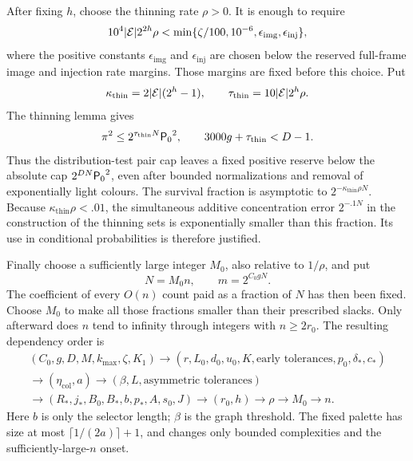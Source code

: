 After fixing \(h\), choose the thinning rate \(\rho>0\).
It is enough to require
\begin{equation}\label{eq:ledger-thinning-rate}
 10^4|\mathcal E|2^{2h}\rho
   <\min\{\zeta/100,10^{-6},\epsilon_{\mathrm{img}},
                  \epsilon_{\mathrm{inj}}\},
\end{equation}
where the positive constants \(\epsilon_{\mathrm{img}}\) and
\(\epsilon_{\mathrm{inj}}\) are chosen below the reserved
full-frame image and injection rate margins.  Those margins
are fixed before this choice.  Put
\[
 \kappa_{\mathrm{thin}}=2|\mathcal E|(2^h-1),\qquad
 \tau_{\mathrm{thin}}=10|\mathcal E|2^h\rho.
\]
The thinning lemma gives
\begin{equation}\label{eq:ledger-thinned-density}
 \pi^2\le2^{\tau_{\mathrm{thin}}N}{\mathsf P_0}^2,
 \qquad 3000g+\tau_{\mathrm{thin}}<D-1.
\end{equation}
Thus the distribution-test pair cap leaves a fixed positive
reserve below the absolute cap \(2^{DN}{\mathsf P_0}^2\), even after
bounded normalizations and removal of exponentially light colours.
The survival fraction is asymptotic to
\(2^{-\kappa_{\mathrm{thin}}\rho N}\).
Because \(\kappa_{\mathrm{thin}}\rho<.01\), the simultaneous
additive concentration error \(2^{-.1N}\) in the construction
of the thinning sets is exponentially smaller than this fraction.
Its use in conditional probabilities is therefore justified.

Finally choose a sufficiently large integer \(M_0\), also relative
to \(1/\rho\), and put
\begin{equation}
                  N=M_0n,\qquad m=2^{C_0gN}.
 \label{eq:ledger-final-dimensions}
\end{equation}
The coefficient of every \(O(n)\) count paid as a fraction of \(N\)
has then been fixed. Choose \(M_0\) to make all those fractions
smaller than their prescribed slacks. Only afterward does \(n\)
tend to infinity through integers with \(n\ge2r_0\).
The resulting dependency order is
\[
 \begin{gathered}
 (C_0,g,D,M,k_{\max},\zeta,K_1)
 \longrightarrow
 (r,L_0,d_0,u_0,K,\text{early tolerances},p_0,\delta_*,c_*)\\
 \longrightarrow(\eta_{\mathrm{col}},a)
 \longrightarrow(\beta,L,\text{asymmetric tolerances})\\
 \longrightarrow(R_*,j_*,B_0,B_*,b,p_*,A,s_0,J)
 \longrightarrow(r_0,h)\longrightarrow\rho
 \longrightarrow M_0\longrightarrow n .
 \end{gathered}
\]
Here \(b\) is only the selector length; \(\beta\) is the graph
threshold.  The fixed palette has size at most
\(\lceil1/(2a)\rceil+1\), and changes only bounded complexities
and the sufficiently-large-\(n\) onset.

